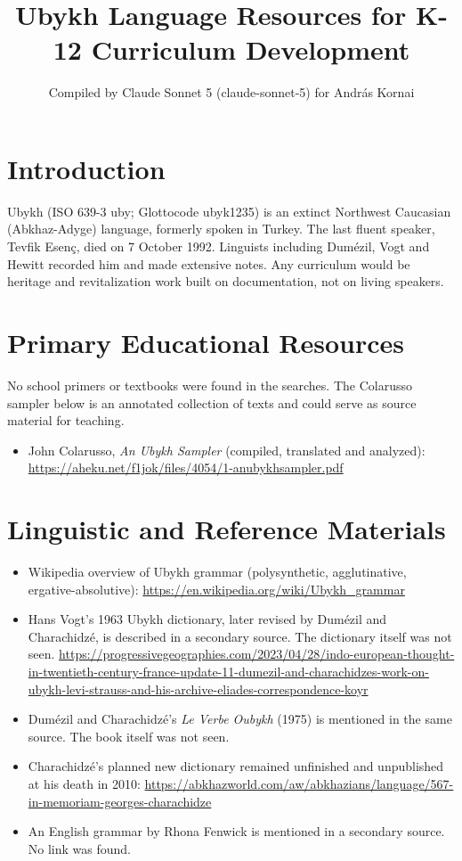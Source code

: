 \documentclass[12pt]{article}
\title{Ubykh Language Resources for K-12 Curriculum Development}
\author{Compiled by Claude Sonnet 5 (claude-sonnet-5) for Andr\'as Kornai}
\date{}
\begin{document}
\maketitle

\section{Introduction}
Ubykh (ISO 639-3 uby; Glottocode ubyk1235) is an extinct Northwest Caucasian (Abkhaz-Adyge) language, formerly spoken in Turkey. The last fluent speaker, Tevfik Esen\c{c}, died on 7 October 1992. Linguists including Dum\'ezil, Vogt and Hewitt recorded him and made extensive notes. Any curriculum would be heritage and revitalization work built on documentation, not on living speakers.

\section{Primary Educational Resources}
No school primers or textbooks were found in the searches. The Colarusso sampler below is an annotated collection of texts and could serve as source material for teaching.
\begin{itemize}
\item John Colarusso, \emph{An Ubykh Sampler} (compiled, translated and analyzed): \url{https://aheku.net/f1jok/files/4054/1-anubykhsampler.pdf}
\end{itemize}

\section{Linguistic and Reference Materials}
\begin{itemize}
\item Wikipedia overview of Ubykh grammar (polysynthetic, agglutinative, ergative-absolutive): \url{https://en.wikipedia.org/wiki/Ubykh_grammar}
\item Hans Vogt's 1963 Ubykh dictionary, later revised by Dum\'ezil and Charachidz\'e, is described in a secondary source. The dictionary itself was not seen. \url{https://progressivegeographies.com/2023/04/28/indo-european-thought-in-twentieth-century-france-update-11-dumezil-and-charachidzes-work-on-ubykh-levi-strauss-and-his-archive-eliades-correspondence-koyr}
\item Dum\'ezil and Charachidz\'e's \emph{Le Verbe Oubykh} (1975) is mentioned in the same source. The book itself was not seen.
\item Charachidz\'e's planned new dictionary remained unfinished and unpublished at his death in 2010: \url{https://abkhazworld.com/aw/abkhazians/language/567-in-memoriam-georges-charachidze}
\item An English grammar by Rhona Fenwick is mentioned in a secondary source. No link was found.
\end{itemize}
\end{document}
